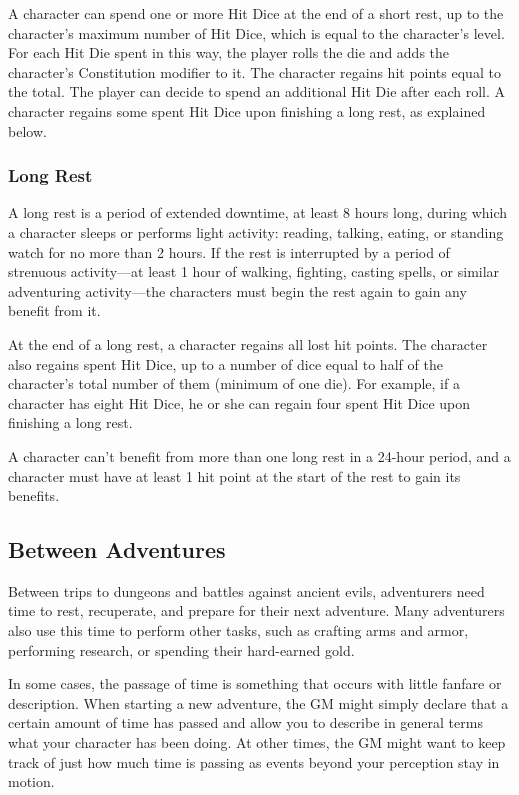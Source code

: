 \documentclass[
]{article}
\begin{document}
A character can spend one or more Hit Dice at the end of a short rest,
up to the character's maximum number of Hit Dice, which is equal to the
character's level. For each Hit Die spent in this way, the player rolls
the die and adds the character's Constitution modifier to it. The
character regains hit points equal to the total. The player can decide
to spend an additional Hit Die after each roll. A character regains some
spent Hit Dice upon finishing a long rest, as explained below.

\hypertarget{long-rest}{%
\subsubsection{Long Rest}\label{long-rest}}

A long rest is a period of extended downtime, at least 8 hours long,
during which a character sleeps or performs light activity: reading,
talking, eating, or standing watch for no more than 2 hours. If the rest
is interrupted by a period of strenuous activity---at least 1 hour of
walking, fighting, casting spells, or similar adventuring activity---the
characters must begin the rest again to gain any benefit from it.

At the end of a long rest, a character regains all lost hit points. The
character also regains spent Hit Dice, up to a number of dice equal to
half of the character's total number of them (minimum of one die). For
example, if a character has eight Hit Dice, he or she can regain four
spent Hit Dice upon finishing a long rest.

A character can't benefit from more than one long rest in a 24-hour
period, and a character must have at least 1 hit point at the start of
the rest to gain its benefits.

\hypertarget{between-adventures}{%
\subsection{Between Adventures}\label{between-adventures}}

Between trips to dungeons and battles against ancient evils, adventurers
need time to rest, recuperate, and prepare for their next adventure.
Many adventurers also use this time to perform other tasks, such as
crafting arms and armor, performing research, or spending their
hard-earned gold.

In some cases, the passage of time is something that occurs with little
fanfare or description. When starting a new adventure, the GM might
simply declare that a certain amount of time has passed and allow you to
describe in general terms what your character has been doing. At other
times, the GM might want to keep track of just how much time is passing
as events beyond your perception stay in motion.
\end{document}
